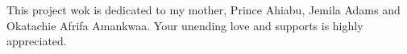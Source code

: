 
\begin{dedication} %
This project wok is dedicated to my mother, Prince Ahiabu, Jemila Adams and Okatachie Afrifa Amankwaa. Your unending love and supports is highly appreciated.  

\end{dedication}

